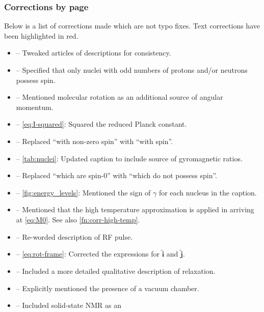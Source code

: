 \documentclass[12pt]{article}
\begin{document}
    \subsubsection*{Corrections by page}
    Below is a list of corrections made which are not typo fixes. Text
    corrections have been highlighted in red.
    \begin{itemize}
        \item {} -- Tweaked articles of descriptions
            for consistency.
        \item {} -- Specified that only nuclei with odd
            numbers of protons and/or neutrons possess spin.
        \item {} -- Mentioned molecular rotation as
            an additional source of angular momentum.
        \item {} -- \cref{eq:I-squared}: Squared the
            reduced Planck constant.
        \item {} -- Replaced ``with non-zero spin'' with
            ``with spin''.
        \item {} -- \cref{tab:nuclei}: Updated caption to
            include source of gyromagnetic ratios.
        \item {} -- Replaced ``which are spin-0'' with ``which
            do not possess spin''.
        \item {} --  \cref{fig:energy_levels}:
            Mentioned the sign of $\gamma$ for each nucleus in the caption.
        \item {} --  Mentioned that the high temperature
            approximation is applied in arriving at \cref{eq:M0}. See also
            \cref{fn:corr-high-temp}.
        \item {} --  Re-worded description of RF pulse.
        \item {} -- \cref{eq:rot-frame}: Corrected the
            expressions for $\tilde{\symbf{i}}$ and $\tilde{\symbf{j}}$.
        \item {} -- Included a more detailed
            qualitative description of relaxation.
        \item {} -- Explicitly mentioned the presence of a
            vacuum chamber.
        \item {} -- Included solid-state NMR as an

\end{itemize}
\end{document}
